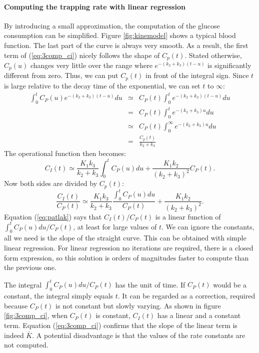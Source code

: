 \paragraph{Computing the trapping rate with linear regression\\}
By introducing a small approximation, the computation of the glucose
consumption can be simplified. Figure \ref{fig:kinemodel} shows a typical
blood function. The last part of the curve is always very smooth. As a result,
the first term of (\ref{eq:3comp_ci}) nicely follows the shape of
$C_p(t)$. Stated otherwise, $C_p(u)$ changes very little over the range where
$e^{-(k_2 + k_3)(t - u)}$ is significantly different from zero. Thus, we can
put $C_p(t)$ in front of the integral sign. Since $t$ is large relative to the
decay time of the exponential, we can set $t$ to $\infty$:
\begin{eqnarray}
\int_0^t C_P(u) e^{-(k_2 + k_3)(t - u)}du
  & \simeq &  C_P(t) \int_0^t  e^{-(k_2 + k_3)(t - u)}du\\
  & =      &  C_P(t) \int_0^t  e^{-(k_2 + k_3)u}du\\
  & \simeq &  C_P(t) \int_0^\infty  e^{-(k_2 + k_3)u}du\\
  & = & \frac{C_p(t)}{k_2 + k_3}
\end{eqnarray}
The operational function then becomes:
\begin{equation}
  C_I(t) \simeq \frac{K_1 k_3}{k_2 + k_3} \int_0^t C_P(u) du + 
  \frac{K_1 k_2}{(k_2 + k_3)^2} C_P(t).
\end{equation}
Now both sides are divided by $C_p(t)$:
\begin{equation}
  \frac{C_I(t)}{C_P(t)} \simeq 
    \frac{K_1 k_3}{k_2 + k_3} \frac{\int_0^t C_P(u) du}{C_P(t)} + 
  \frac{K_1 k_2}{(k_2 + k_3)^2}. \label{eq:patlak}
\end{equation}
Equation (\ref{eq:patlak}) says that $C_I(t)/C_P(t)$ is a linear function of
$\int_0^t C_P(u) du / C_P(t)$, at least for large values of $t$. We can ignore
the constants, all we need is the slope of the straight curve. This can be
obtained with simple linear regression. For linear regression no iterations
are required, there is a closed form expression, so this solution is orders of
magnitudes faster to compute than the previous one. 

The integral $\int_0^t C_P(u) du / C_P(t)$ has the unit of time. If $C_P(t)$
would be a constant, the integral simply equals $t$. It can be regarded as a
correction, required because $C_P(t)$ is not constant but slowly varying. As
shown in figure \ref{fig:3comp_ci}, when $C_P(t)$ is constant, $C_I(t)$ has
a linear and a constant term. Equation (\ref{eq:3comp_ci}) confirms that the
slope of the linear term is indeed $\bar{K}$. A potential disadvantage is that
the values of the rate constants are not computed.



